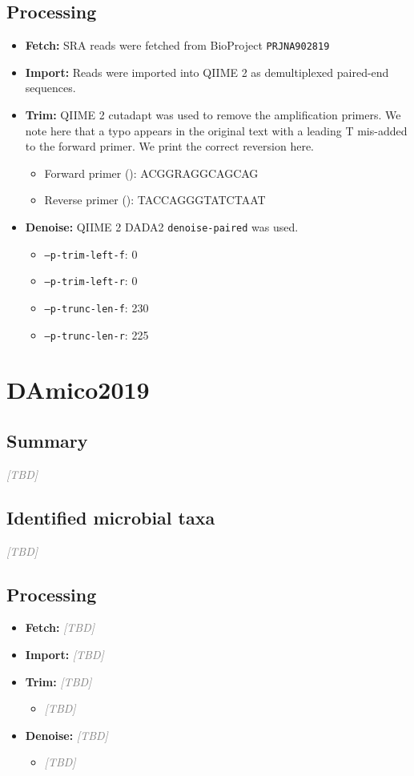 \documentclass[11pt,a4paper]{article}
\newcommand{\tbd}{\textcolor{gray}{\emph{[TBD]}}}
\begin{document}
\subsection{Processing}
\begin{itemize}
\item \textbf{Fetch:} SRA reads were fetched from BioProject \texttt{PRJNA902819}
\item \textbf{Import:} Reads were imported into QIIME 2 as demultiplexed paired-end sequences.
\item \textbf{Trim:} QIIME 2 cutadapt was used to remove the amplification primers. We note here that a typo appears in the original text with a leading T mis-added to the forward primer. We print the correct reversion here. 
  \begin{itemize}
  \item Forward primer (): ACGGRAGGCAGCAG
  \item Reverse primer (): TACCAGGGTATCTAAT
  \end{itemize}
\item \textbf{Denoise:} QIIME 2 DADA2 \texttt{denoise-paired} was used.
  \begin{itemize}
  \item \texttt{--p-trim-left-f}: 0
  \item \texttt{--p-trim-left-r}: 0
  \item \texttt{--p-trunc-len-f}: 230
  \item \texttt{--p-trunc-len-r}: 225
  \end{itemize}
\end{itemize}

\section{DAmico2019}
\subsection{Summary}
\tbd

\subsection{Identified microbial taxa}
\tbd

\subsection{Processing}
\begin{itemize}
\item \textbf{Fetch:} \tbd
\item \textbf{Import:} \tbd
\item \textbf{Trim:} \tbd
  \begin{itemize}
  \item \tbd
  \end{itemize}
\item \textbf{Denoise:} \tbd
  \begin{itemize}
  \item \tbd
  \end{itemize}
\end{itemize}
\end{document}

